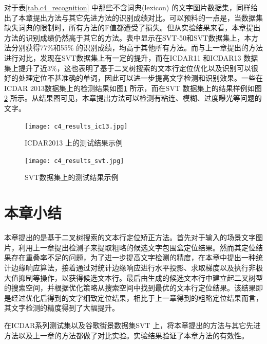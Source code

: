         对于表\ref{tab.c4_recognition} 中那些不含词典(lexicon) 的文字图片数据集，同样给出了本章提出方法与其它先进方法的识别成绩对比。可以预料的一点是，当数据集缺失词典的限制时，所有方法的F值都遭受了损失。但从实验结果来看，本章提出方法的识别成绩仍然高于其它的方法。表中显示在SVT-50和SVT数据集上，本方法分别获得77\%和55\% 的识别成绩，均高于其他所有方法。而与上一章提出的方法进行对比，发现在SVT数据集上有一定的提升，而在ICDAR11 和ICDAR13 数据集上提升了近3\%，这也表明了基于二叉树搜索的文本行定位优化以及识别可以很好的处理定位不甚准确的单词，因此可以进一步提高文字检测和识别效果。一些在ICDAR 2013数据集上的检测结果如图\ref{fig.c4_results_ic13} 所示，而在SVT 数据集上的结果样例如图\ref{fig.c4_results_svt} 所示。从结果图可见，本章提出方法可以检测有粘连、模糊、过度曝光等问题的文字。

        \begin{figure}[!h]
        \centering
        \texttt{[image: c4\_results\_ic13.jpg]}
        \caption{ICDAR2013 上的测试结果示例}
        \label{fig.c4_results_ic13}
        \end{figure}

        \begin{figure}[!h]
        \centering
        \texttt{[image: c4\_results\_svt.jpg]}
        \caption{SVT数据集上的测试结果示例}
        \label{fig.c4_results_svt}
        \end{figure}


    \section{本章小结}

    本章提出的是基于二叉树搜索的文本行定位矫正方法。首先对于输入的场景文字图片，利用上一章提出检测子来提取粗略的候选文字包围盒定位结果。然而其定位结果存在重叠率不足的问题，为了进一步提高文字检测的精度，在本章中提出一种统计边缘响应算法，接着通过对统计边缘响应进行水平投影、求取梯度以及执行非极大值抑制等操作，以获得候选文本行。最后由生成的候选文本行中建立起二叉树型的搜索空间，并根据优化策略从搜索空间中找到最优的文本行定位结果。该结果即是经过优化后得到的文字细致定位结果，相比于上一章得到的粗略定位结果而言，其文字检测的精度得到了大幅提升。

    在ICDAR系列测试集以及谷歌街景数据集SVT 上，将本章提出的方法与其它先进方法以及上一章的方法都做了对比实验。实验结果验证了本章方法的有效性。


